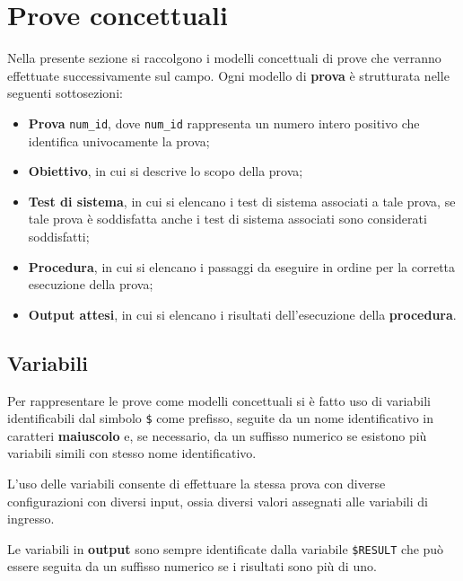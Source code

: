 \documentclass[../Sperimentazione.tex]{subfiles}
\begin{document}
	
\section{Prove concettuali}
	Nella presente sezione si raccolgono i modelli concettuali di prove che verranno effettuate successivamente sul campo. Ogni modello di \textbf{prova} è strutturata nelle seguenti sottosezioni:
	\begin{itemize}
		\item \textbf{Prova} \verb|num_id|, dove \verb|num_id| rappresenta un numero intero positivo che identifica univocamente la prova;
		\item \textbf{Obiettivo}, in cui si descrive lo scopo della prova;
		\item \textbf{Test di sistema}, in cui si elencano i test di sistema associati a tale prova, se tale prova è soddisfatta anche i test di sistema associati sono considerati soddisfatti;
		\item \textbf{Procedura}, in cui si elencano i passaggi da eseguire in ordine per la corretta esecuzione della prova;
		\item \textbf{Output attesi}, in cui si elencano i risultati dell'esecuzione della \textbf{procedura}.
	\end{itemize}
	
\subsection{Variabili}
	Per rappresentare le prove come modelli concettuali si è fatto uso di variabili identificabili dal simbolo \verb|$| come prefisso, seguite da un nome identificativo in caratteri \textbf{maiuscolo} e, se necessario, da un suffisso numerico se esistono più variabili simili con stesso nome identificativo.

	L'uso delle variabili consente di effettuare la stessa prova con diverse configurazioni con diversi input, ossia diversi valori assegnati alle variabili di ingresso.
	
	Le variabili in \textbf{output} sono sempre identificate dalla variabile \verb|$RESULT| che può essere seguita da un suffisso numerico se i risultati sono più di uno.
	
\end{document}
